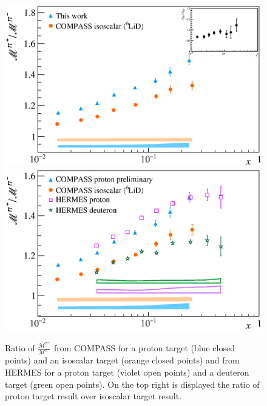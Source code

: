 \begin{figure}[!h]
  \centering
	\includegraphics[scale=0.5]{./gfx/Mult_pi_ratio_noH.eps}
	\includegraphics[scale=0.5]{./gfx/Mult_pi_ratio.eps}
	\caption{Ratio of $\frac{\mathscr{M}^{\pi^+}}{\mathscr{M}^{\pi^-}}$ from COMPASS for a proton target (blue closed points) and an isoscalar target (orange closed points) and from HERMES for a proton target (violet open points) and a deuteron target (green open points). On the top right is displayed the ratio of proton target result over isoscalar target result.}
	\label{pic:piratio}
\end{figure}

\newpage

